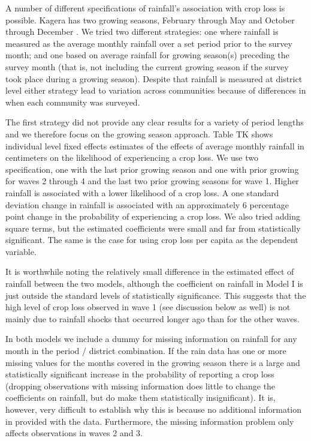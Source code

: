 \documentclass[letterpaper,12pt]{article}
\begin{document}
\begin{enumerate}
A number of different specifications of rainfall's association with 
crop loss is possible.
Kagera has two growing seasons, February through May and
October through December \citep[p 6]{Tanzania2007}.
We tried two different strategies: 
one where rainfall is measured as the average monthly rainfall 
over a set period prior to the survey month; 
and one based on average rainfall for growing season(s) preceding 
the survey month 
(that is, not including the current growing season if the survey
took place during a growing season).
Despite that rainfall is measured at district level either strategy
lead to variation across communities because of differences in 
when each community was surveyed.

The first strategy did not provide any clear results for a variety
of period lengths and we therefore focus on the growing season approach.
Table TK shows individual level fixed effects estimates of the 
effects of average monthly rainfall in centimeters on the likelihood
of experiencing a crop loss.
We use two specification, one with the last prior growing season and 
one with prior growing for waves 2 through 4 and the last two prior 
growing seasons for wave 1.
Higher rainfall is associated with a lower likelihood of a crop loss. 
A one standard deviation change in rainfall is associated with an
approximately 6 percentage point change in the probability of 
experiencing a crop loss.
We also tried adding square terms, but the estimated coefficients
were small and far from statistically significant.
The same is the case for using crop loss per capita as the dependent
variable. 

It is worthwhile noting the relatively small difference in the 
estimated effect of rainfall between the two models, 
although the coefficient on rainfall in Model I is just outside
the standard levels of statistically significance.
This suggests that the high level of crop loss observed in
wave 1 (see discussion below as well) is not mainly due to 
rainfall shocks that occurred longer ago than for the other waves.

In both models we include a dummy for missing information on rainfall 
for any month in the period / district combination.
If the rain data has one or more missing values for the months
covered in the growing season there is a large and statistically 
significant increase in the probability of reporting a crop loss
(dropping observations with missing information does little
to change the coefficients on rainfall, but do make them
statistically insignificant).
It is, however, very difficult to establish why this is because
no additional information in provided with the data.
Furthermore, the missing information problem only affects
observations in waves 2 and 3.


\end{enumerate}
\end{document}
